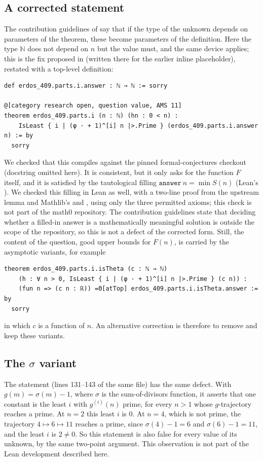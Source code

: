 \documentclass[11pt]{amsart}
\theoremstyle{plain}
\theoremstyle{definition}
\newcommand{\N}{\mathbb{N}}
\begin{document}
\subsection*{A corrected statement}
The contribution guidelines of \cite{FC} say that if the type of the unknown depends on parameters of the theorem, these become parameters of the definition. Here the type $\N$ does not depend on $n$ but the value must, and the same device applies; this is the fix proposed in \cite{PR5446} (written there for the earlier inline placeholder), restated with a top-level definition:
\begin{lstlisting}
def erdos_409.parts.i.answer : ℕ → ℕ := sorry

@[category research open, question value, AMS 11]
theorem erdos_409.parts.i (n : ℕ) (hn : 0 < n) :
    IsLeast { i | (φ · + 1)^[i] n |>.Prime } (erdos_409.parts.i.answer n) := by
  sorry
\end{lstlisting}
We checked that this compiles against the pinned formal-conjectures checkout (docstring omitted here). It is consistent, but it only asks for the function $F$ itself, and it is satisfied by the tautological filling $\texttt{answer}\ n=\min S(n)$ (Lean's ). We checked this filling in Lean as well, with a two-line proof from the upstream lemma  and Mathlib's  and , using only the three permitted axioms; this check is not part of the math0 repository. The contribution guidelines state that deciding whether a filled-in answer is a mathematically meaningful solution is outside the scope of the repository, so this is not a defect of the corrected form. Still, the content of the question, good upper bounds for $F(n)$, is carried by the asymptotic variants, for example
\begin{lstlisting}
theorem erdos_409.parts.i.isTheta (c : ℕ → ℕ)
    (h : ∀ n > 0, IsLeast { i | (φ · + 1)^[i] n |>.Prime } (c n)) :
    (fun n => (c n : ℝ)) =Θ[atTop] erdos_409.parts.i.isTheta.answer := by
  sorry
\end{lstlisting}
in which $c$ is a function of $n$. An alternative correction is therefore to remove  and keep these variants.

\subsection*{The \texorpdfstring{$\sigma$}{sigma} variant}
The statement  (lines 131--143 of the same file) has the same defect. With $g(m)=\sigma(m)-1$, where $\sigma$ is the sum-of-divisors function, it asserts that one constant  is the least $i$ with $g^{(i)}(n)$ prime, for every $n>1$ whose $g$-trajectory reaches a prime. At $n=2$ this least $i$ is $0$. At $n=4$, which is not prime, the trajectory $4\mapsto 6\mapsto 11$ reaches a prime, since $\sigma(4)-1=6$ and $\sigma(6)-1=11$, and the least $i$ is $2\ne 0$. So this statement is also false for every value of its unknown, by the same two-point argument. This observation is not part of the Lean development described here.
\end{document}
